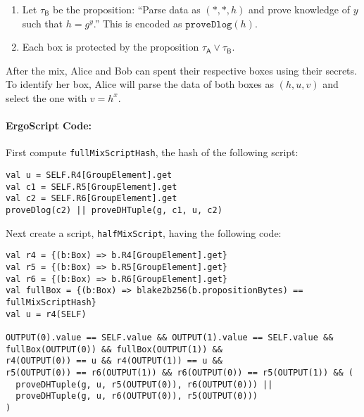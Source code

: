 \documentclass[11pt]{article}
\newcommand{\langname}{ErgoScript\xspace}
\newcommand{\mixname}{ErgoMix\xspace}
\begin{document}
\begin{enumerate}
\begin{enumerate}
		\item Let $\tau_{\textsf{B}}$ be the proposition: ``Parse data as $(*, *, h)$ and
		prove knowledge of $y$ such that $h = {g}^{y}$.'' This is encoded as $\texttt{proveDlog}(h)$.
		
		\item Each box is protected by the proposition $\tau_\textsf{A} \lor \tau_\textsf{B}$. 
		
	\end{enumerate}

\end{enumerate}
	After the mix, Alice and Bob can spent their respective boxes using their secrets. 
	To identify her box, Alice will parse the data of both boxes as $(h, u, v)$ and select the one with $v = h^x$. 

\paragraph{\langname Code:} First compute \texttt{fullMixScriptHash}, the hash of the following script:
\begin{verbatim}
val u = SELF.R4[GroupElement].get
val c1 = SELF.R5[GroupElement].get
val c2 = SELF.R6[GroupElement].get
proveDlog(c2) || proveDHTuple(g, c1, u, c2)
\end{verbatim}

Next create a script, \texttt{halfMixScript}, having the following code:
\begin{verbatim}
val r4 = {(b:Box) => b.R4[GroupElement].get}
val r5 = {(b:Box) => b.R5[GroupElement].get}
val r6 = {(b:Box) => b.R6[GroupElement].get}
val fullBox = {(b:Box) => blake2b256(b.propositionBytes) == fullMixScriptHash}
val u = r4(SELF)

OUTPUT(0).value == SELF.value && OUTPUT(1).value == SELF.value && 
fullBox(OUTPUT(0)) && fullBox(OUTPUT(1)) && 
r4(OUTPUT(0)) == u && r4(OUTPUT(1)) == u && 
r5(OUTPUT(0)) == r6(OUTPUT(1)) && r6(OUTPUT(0)) == r5(OUTPUT(1)) && (
  proveDHTuple(g, u, r5(OUTPUT(0)), r6(OUTPUT(0))) || 
  proveDHTuple(g, u, r6(OUTPUT(0)), r5(OUTPUT(0)))
)
\end{verbatim}
\end{document}
